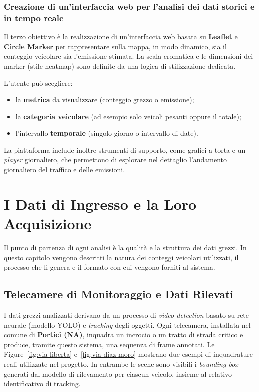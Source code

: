 \documentclass[12pt, oneside]{extbook}
\begin{document}
\subsection{Creazione di un'interfaccia web per l'analisi dei dati storici e in tempo reale}

Il terzo obiettivo è la realizzazione di un'interfaccia web basata su \textbf{Leaflet} e \textbf{Circle Marker} per rappresentare sulla mappa, in modo dinamico, sia il conteggio veicolare sia l'emissione stimata.
La scala cromatica e le dimensioni dei marker (stile heatmap) sono definite da una logica di stilizzazione dedicata.

L'utente può scegliere:
\begin{itemize}
\item la \textbf{metrica} da visualizzare (conteggio grezzo o emissione);
\item la \textbf{categoria veicolare} (ad esempio solo veicoli pesanti oppure il totale);
\item l'intervallo \textbf{temporale} (singolo giorno o intervallo di date).
\end{itemize}

La piattaforma include inoltre strumenti di supporto, come grafici a torta e un \emph{player} giornaliero, che permettono di esplorare nel dettaglio l'andamento giornaliero del traffico e delle emissioni.


\chapter{I Dati di Ingresso e la Loro Acquisizione}

Il punto di partenza di ogni analisi è la qualità e la struttura dei dati grezzi. In questo capitolo vengono descritti la natura dei conteggi veicolari utilizzati, il processo che li genera e il formato con cui vengono forniti al sistema.

\section{Telecamere di Monitoraggio e Dati Rilevati}

I dati grezzi analizzati derivano da un processo di \emph{video detection} basato su rete neurale (modello YOLO) e \emph{tracking} degli oggetti. Ogni telecamera, installata nel comune di \textbf{Portici (NA)}, inquadra un incrocio o un tratto di strada critico e produce, tramite questo sistema, una sequenza di frame annotati. Le Figure~\ref{fig:via-liberta} e~\ref{fig:via-diaz-moro} mostrano due
esempi di inquadrature reali utilizzate nel progetto. In entrambe le
scene sono visibili i \emph{bounding box} generati dal modello di
rilevamento per ciascun veicolo, insieme al relativo identificativo di tracking.
\end{document}
